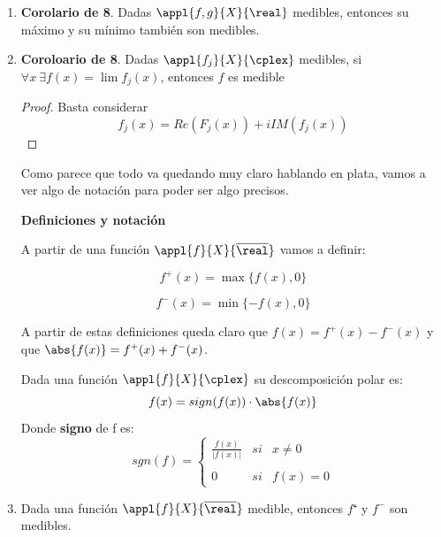 \documentclass{apuntes}
\begin{document}
\begin{enumerate}
\begin{proof}
\begin{enumerate}
\item $g_2(x) = - \sup\{f_j(x)\}$

\item $g_3(x) = \limsup f_j(x) = \lim_n \sup_{j \geq n}\{f_j(x)\}=\inf_n \sup_{j \geq n}\{f_j(x)\}$ es medible
\end{enumerate}
\end{proof}
\item \textbf{Corolario de 8}. Dadas $\appl{f,g}{X}{\real}$ medibles, entonces su máximo y su mínimo también son medibles.

\item \textbf{Coroloario de 8}. Dadas $\appl{f_j}{X}{\cplex}$ medibles, si $\forall x \ \exists f(x)=\lim f_j(x)$, entonces $f$ es medible
\begin{proof}
Basta considerar
\[f_j(x) = Re(F_j(x))+ i IM(f_j(x))\]
\end{proof}

Como parece que todo va quedando muy claro hablando en plata, vamos a ver algo de notación para poder ser algo precisos.

\textbf{Definiciones y notación}

A partir de una función $\appl{f}{X}{\overline{\real}}$ vamos a definir:

\begin{defn}[.$f^+(x)$]
\[f^+(x)=\max \{f(x), 0\}\]
\end{defn}

\begin{defn}[.$f^-(x)$]
\[f^-(x)=\min \{-f(x), 0\}\]
\end{defn}

A partir de estas definiciones queda claro que $f(x)=f^+(x)-f^-(x)$ y que $\abs{f(x)}=f^+(x)+f^-(x)$.

\begin{defn}
Dada una función $\appl{f}{X}{\cplex}$ su descomposición polar es:
\[f(x)=sign(f(x))\cdot\abs{f(x)}\]
Donde \textbf{signo} de f es:
\[sgn(f)=\left\{ \begin{array}{lcc}
             \frac{f(x)}{|f(x)|} &   si  & x \neq 0 \\
             \\ 0 &  si  & f(x) = 0
             \end{array}
   \right.\]
\end{defn}

\item Dada una función $\appl{f}{X}{\overline{\real}}$ medible, entonces $f⁺$ y $f^-$ son medibles.


\end{enumerate}
\end{document}
